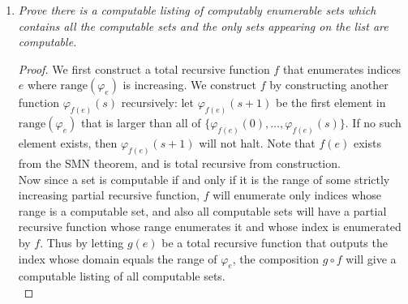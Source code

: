 \documentclass{article}
\begin{document}
\begin{enumerate}[label={\bf Q\arabic*:}]
\begin{proof}
      Since the number of theories considered is finite, we will eventually
      exhaust all possible consistent theories, and be unable to find an
      unused consistent theory to prove either $\varphi$ or $\neg\varphi$.
      Thus $\varphi$ is independent in all consistent $T_1,\ldots,T_n$. \\

      Note that if we begin by assuming that $T_1$ proves $\neg\varphi$
      instead of $\varphi$, we can also use the same alternating series
      argument to get a contradiction. 

    \end{proof}

  \item \it Prove there is a computable listing of computably enumerable
    sets which contains all the computable sets and the only sets appearing
    on the list are computable.

    \begin{proof}
      We first construct a total recursive function $f$ that enumerates
      indices $e$ where $\text{range}(\varphi_e)$ is increasing. We
      construct $f$ by constructing another function $\varphi_{f(e)}(s)$
      recursively: let $\varphi_{f(e)}(s+1)$ be the first element in
      $\text{range}(\varphi_e)$ that is larger than all of
      $\{\varphi_{f(e)}(0), \ldots,\varphi_{f(e)}(s)\}$. If no such element
      exists, then $\varphi_{f(e)}(s+1)$ will not halt. Note that $f(e)$
      exists from the SMN theorem, and is total recursive from
      construction. \\

      Now since a set is computable if and only if it is the range of some
      strictly increasing partial recursive function, $f$ will enumerate
      only indices whose range is a computable set, and also all computable
      sets will have a partial recursive function whose range enumerates it
      and whose index is enumerated by $f$. Thus by letting $g(e)$ be a
      total recursive function that outputs the index whose domain equals
      the range of $\varphi_e$, the composition $g\circ f$ will give a
      computable listing of all computable sets. \\


\end{proof}
\end{enumerate}
\end{document}
